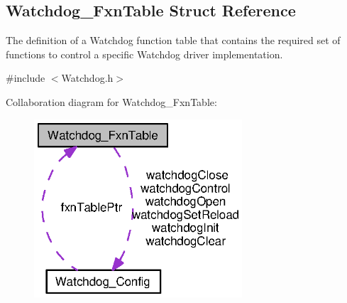 \subsection{Watchdog\+\_\+\+Fxn\+Table Struct Reference}
\label{struct_watchdog___fxn_table}


The definition of a Watchdog function table that contains the required set of functions to control a specific Watchdog driver implementation.  




{\ttfamily \#include $<$Watchdog.\+h$>$}



Collaboration diagram for Watchdog\+\_\+\+Fxn\+Table\+:
\nopagebreak
\begin{figure}[H]
\begin{center}
\leavevmode
\includegraphics[width=220pt]{struct_watchdog___fxn_table__coll__graph}
\end{center}
\end{figure}
